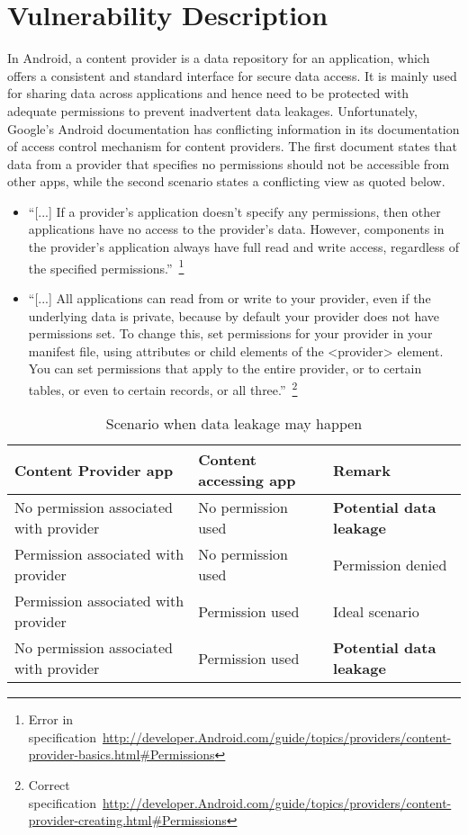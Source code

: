 \section{Vulnerability Description}
\label{vuln}
\noindent
In Android, a content provider is a data repository for an application, which offers a consistent and standard interface for secure data access. It is mainly used for sharing data across applications and hence need to be protected with adequate permissions to prevent inadvertent data leakages. Unfortunately, Google's Android documentation has conflicting information in its documentation of access control mechanism for content providers. The first document states that data from a provider that specifies no permissions should not be accessible from other apps, while the second scenario states a conflicting view as quoted below.
\begin{itemize}
 \item ``[...] If a provider's application doesn't specify any permissions, then other applications have no access to the provider's data. However, components in the provider's application always have full read and write access, regardless of the specified permissions.''~\footnote{Error in specification~\url{http://developer.Android.com/guide/topics/providers/content-provider-basics.html#Permissions}}
 \item ``[...] All applications can read from or write to your provider, even if the underlying data is private, because by default your provider does not have permissions set. To change this, set permissions for your provider in your manifest file, using attributes or child elements of the <provider> element. You can set permissions that apply to the entire provider, or to certain tables, or even to certain records, or all three.''~\footnote{Correct specification~\url{http://developer.Android.com/guide/topics/providers/content-provider-creating.html#Permissions}}
\end{itemize}
\begin{center}
	\begin{table}
		\label{tableErrors}
		\begin{tabular}{ | p{2.5cm} | p{2.5cm} | p{2cm} | }
			\hline
			\textbf{Content Provider app} & \textbf{Content accessing app} & \textbf{Remark} \\
			\hline \hline
			No permission associated with provider & No permission used & \textcolor[rgb]{1,0,0}{\textbf{Potential data leakage}} \\
			\hline
			Permission associated with provider & No permission used & Permission denied \\
			\hline
			Permission associated with provider & Permission used & Ideal scenario \\
			\hline
			No permission associated with provider & Permission used & \textcolor[rgb]{1,0,0}{\textbf{Potential data leakage}} \\
			\hline
		\end{tabular}
		\caption{Scenario when data leakage may happen}
	\end{table}
\end{center}

